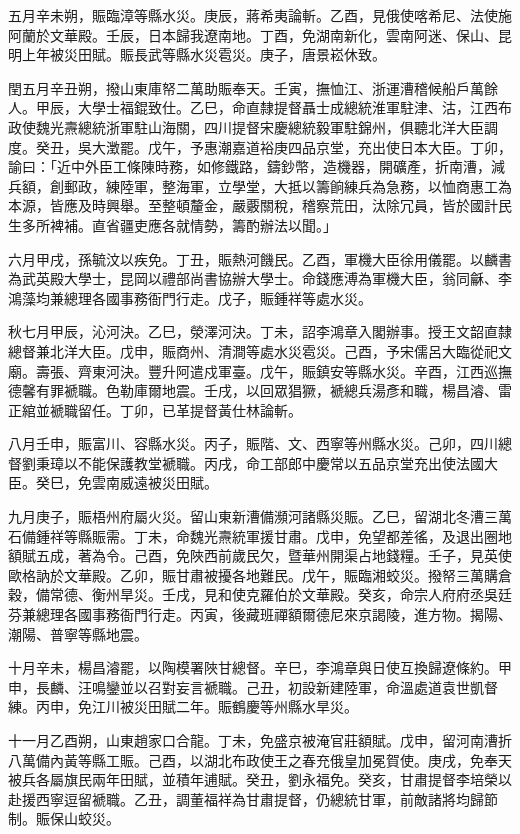 \begin{pinyinscope}
五月辛未朔，賑臨漳等縣水災。庚辰，蔣希夷論斬。乙酉，見俄使喀希尼、法使施阿蘭於文華殿。壬辰，日本歸我遼南地。丁酉，免湖南新化，雲南阿迷、保山、昆明上年被災田賦。賑長武等縣水災雹災。庚子，唐景崧休致。

閏五月辛丑朔，撥山東庫帑二萬助賑奉天。壬寅，撫恤江、浙運漕稽候船戶萬餘人。甲辰，大學士福錕致仕。乙巳，命直隸提督聶士成總統淮軍駐津、沽，江西布政使魏光燾總統浙軍駐山海關，四川提督宋慶總統毅軍駐錦州，俱聽北洋大臣調度。癸丑，吳大澂罷。戊午，予惠潮嘉道裕庚四品京堂，充出使日本大臣。丁卯，諭曰：「近中外臣工條陳時務，如修鐵路，鑄鈔幣，造機器，開礦產，折南漕，減兵額，創郵政，練陸軍，整海軍，立學堂，大抵以籌餉練兵為急務，以恤商惠工為本源，皆應及時興舉。至整頓釐金，嚴覈關稅，稽察荒田，汰除冗員，皆於國計民生多所裨補。直省疆吏應各就情勢，籌酌辦法以聞。」

六月甲戌，孫毓汶以疾免。丁丑，賑熱河饑民。乙酉，軍機大臣徐用儀罷。以麟書為武英殿大學士，昆岡以禮部尚書協辦大學士。命錢應溥為軍機大臣，翁同龢、李鴻藻均兼總理各國事務衙門行走。戊子，賑鍾祥等處水災。

秋七月甲辰，沁河決。乙巳，滎澤河決。丁未，詔李鴻章入閣辦事。授王文韶直隸總督兼北洋大臣。戊申，賑商州、清澗等處水災雹災。己酉，予宋儒呂大臨從祀文廟。壽張、齊東河決。豐升阿遣戍軍臺。戊午，賑鎮安等縣水災。辛酉，江西巡撫德馨有罪褫職。色勒庫爾地震。壬戌，以回眾猖獗，褫總兵湯彥和職，楊昌濬、雷正綰並褫職留任。丁卯，已革提督黃仕林論斬。

八月壬申，賑富川、容縣水災。丙子，賑階、文、西寧等州縣水災。己卯，四川總督劉秉璋以不能保護教堂褫職。丙戌，命工部郎中慶常以五品京堂充出使法國大臣。癸巳，免雲南威遠被災田賦。

九月庚子，賑梧州府屬火災。留山東新漕備瀕河諸縣災賑。乙巳，留湖北冬漕三萬石備鍾祥等縣賑需。丁未，命魏光燾統軍援甘肅。戊申，免望都差徭，及退出圈地額賦五成，著為令。己酉，免陜西前歲民欠，暨華州開渠占地錢糧。壬子，見英使歐格訥於文華殿。乙卯，賑甘肅被擾各地難民。戊午，賑臨湘蛟災。撥帑三萬購倉穀，備常德、衡州旱災。壬戌，見和使克羅伯於文華殿。癸亥，命宗人府府丞吳廷芬兼總理各國事務衙門行走。丙寅，後藏班禪額爾德尼來京謁陵，進方物。揭陽、潮陽、普寧等縣地震。

十月辛未，楊昌濬罷，以陶模署陜甘總督。辛巳，李鴻章與日使互換歸遼條約。甲申，長麟、汪鳴鑾並以召對妄言褫職。己丑，初設新建陸軍，命溫處道袁世凱督練。丙申，免江川被災田賦二年。賑鶴慶等州縣水旱災。

十一月乙酉朔，山東趙家口合龍。丁未，免盛京被淹官莊額賦。戊申，留河南漕折八萬備內黃等縣工賑。己酉，以湖北布政使王之春充俄皇加冕賀使。庚戌，免奉天被兵各屬旗民兩年田賦，並積年逋賦。癸丑，劉永福免。癸亥，甘肅提督李培榮以赴援西寧逗留褫職。乙丑，調董福祥為甘肅提督，仍總統甘軍，前敵諸將均歸節制。賑保山蛟災。


\end{pinyinscope}
